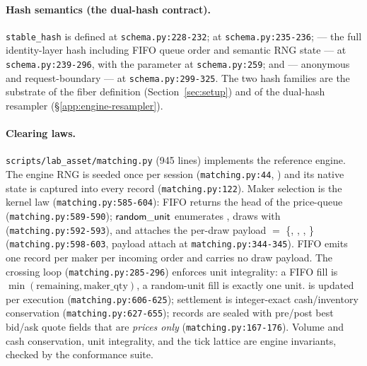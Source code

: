 \paragraph{Hash semantics (the dual-hash contract).}
\texttt{stable\_hash} is defined at \texttt{schema.py:228-232};
 at \texttt{schema.py:235-236};
 --- the full identity-layer hash including FIFO queue
order and semantic RNG state --- at \texttt{schema.py:239-296}, with the
 parameter at \texttt{schema.py:259}; and
 --- anonymous and request-boundary --- at
\texttt{schema.py:299-325}. The two hash families are the substrate of the
fiber definition (Section~\ref{sec:setup}) and of the dual-hash resampler
(\S\ref{app:engine-resampler}).

\paragraph{Clearing laws.}
\texttt{scripts/lab\_asset/matching.py} (945 lines) implements the reference
engine. The engine RNG is seeded once per session
(\texttt{matching.py:44}, ) and
its native state is captured into every record
(\texttt{matching.py:122}). Maker selection is the kernel law
(\texttt{matching.py:585-604}): FIFO returns the head of the price-queue
(\texttt{matching.py:589-590}); $\mathsf{random\_unit}$ enumerates ,
draws  with 
(\texttt{matching.py:592-593}), and attaches the per-draw payload
 $=$ \{, ,
, \} (\texttt{matching.py:598-603},
payload attach at \texttt{matching.py:344-345}). FIFO emits one record per
maker per incoming order and carries no draw payload. The crossing loop
(\texttt{matching.py:285-296}) enforces unit integrality: a FIFO fill is
$\min(\text{remaining}, \text{maker\_qty})$, a random-unit fill is exactly
one unit.  is updated per execution
(\texttt{matching.py:606-625}); settlement is integer-exact cash/inventory
conservation (\texttt{matching.py:627-655}); records are sealed with
pre/post best bid/ask quote fields that are \emph{prices only}
(\texttt{matching.py:167-176}). Volume and cash conservation, unit
integrality, and the tick lattice are engine invariants, checked by the
conformance suite.

